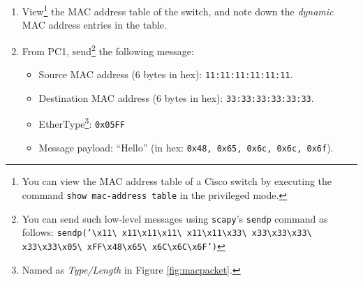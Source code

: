 \documentclass[pdftex,12pt,a4paper]{article}
\begin{document}
            \begin{enumerate}
                \item View\footnote{You can view the MAC address table of a
                Cisco switch by executing the command \texttt{show mac-address
                table} in the privileged mode.} the MAC address table of the
                switch, and note down the \emph{dynamic} MAC address entries in
                the table.

                \item From PC1, send\footnote{You can send such low-level
                messages using \texttt{scapy}'s \texttt{sendp} command as
                follows:
                \texttt{sendp('\textbackslash x11\textbackslash
                x11\textbackslash x11\textbackslash x11\textbackslash
                x11\textbackslash x11\textbackslash x33\textbackslash
                x33\textbackslash x33\textbackslash x33\textbackslash
                x33\textbackslash x33\textbackslash x05\textbackslash
                xFF\textbackslash x48\textbackslash x65\textbackslash
                x6C\textbackslash x6C\textbackslash x6F')}} the following message: 
                    \begin{itemize}
                        \item Source MAC address (6 bytes in hex):
                        \texttt{11:11:11:11:11:11}.
                        \item Destination MAC address (6 bytes in hex):
                        \texttt{33:33:33:33:33:33}.
                        \item EtherType\footnote{Named as \emph{Type/Length} in
                        Figure \ref{fig:macpacket}.}: \texttt{0x05FF}
                        \item Message payload: ``Hello'' (in hex: \texttt{0x48,
                        0x65, 0x6c, 0x6c, 0x6f}).
                    \end{itemize}


\end{enumerate}
\end{document}
